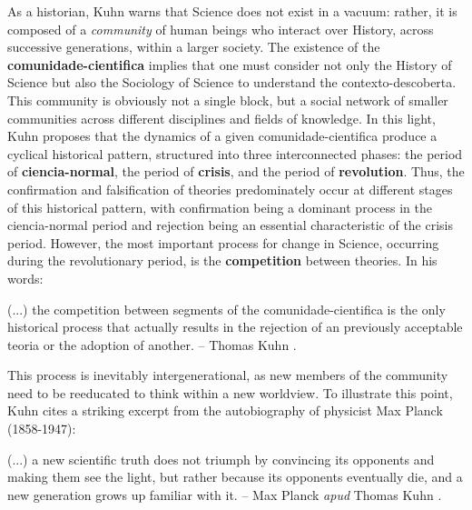 \documentclass[./main_en.tex]{subfiles}
\begin{document}
\par As a historian, Kuhn warns that Science does not exist in a vacuum: rather, it is composed of a \textit{community} of human beings who interact over History, across successive generations, within a larger society. The existence of the \textbf{\gls{comunidade-cientifica}} implies that one must consider not only the History of Science but also the Sociology of Science to understand the \gls{contexto-descoberta}. This community is obviously not a single block, but a social network of smaller communities across different disciplines and fields of knowledge. In this light, Kuhn proposes that the dynamics of a given \gls{comunidade-cientifica} produce a cyclical historical pattern, structured into three interconnected phases: the period of \textbf{\gls{ciencia-normal}}, the period of \textbf{crisis}, and the period of \textbf{revolution}. Thus, the confirmation and falsification of theories predominately occur at different stages of this historical pattern, with confirmation being a dominant process in the \gls{ciencia-normal} period and rejection being an essential characteristic of the crisis period. However, the most important process for change in Science, occurring during the revolutionary period, is the \textbf{competition} between theories. In his words:

\begin{adjustwidth}{100pt}{0pt}
\medskip
\small (...) the competition between segments of the \gls{comunidade-cientifica} is the only historical process that actually results in the rejection of an previously acceptable \gls{teoria} or the adoption of another. -- Thomas Kuhn \cite{kuhn2012structure}.
\medskip
\end{adjustwidth}

\noindent This process is inevitably intergenerational, as new members of the community need to be reeducated to think within a new worldview. To illustrate this point, Kuhn cites a striking excerpt from the autobiography of physicist Max Planck (1858-1947):

\begin{adjustwidth}{100pt}{0pt}
\medskip
\small (...) a new scientific truth does not triumph by convincing its opponents and making them see the light, but rather because its opponents eventually die, and a new generation grows up familiar with it. -- Max Planck \textit{apud} Thomas Kuhn \cite{kuhn2012structure}.
\medskip
\end{adjustwidth}
\end{document}

